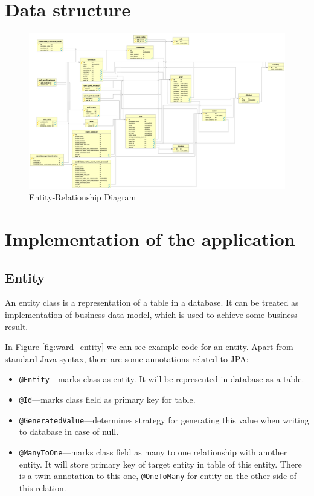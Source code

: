 \documentclass[a4paper,twoside,12pt]{book}
\begin{document}
  \section{Data structure}
    \begin{figure}[h]
      \includegraphics[width=\linewidth]{erd.png}
      \caption{Entity-Relationship Diagram}
      \label{fig:erd}
    \end{figure}

  \section{Implementation of the application}
    \subsection{Entity}
      An entity class is a representation of a table in a database.
      It can be treated as implementation of business data model, which is used to achieve some business result.

      In Figure \ref{fig:ward_entity} we can see example code for an entity.
      Apart from standard Java syntax, there are some annotations related to JPA:
      \begin{itemize}
        \item\lstinline|@Entity|---marks class as entity. It will be represented in database as a table.
        \item\lstinline|@Id|---marks class field as primary key for table.
        \item\lstinline|@GeneratedValue|---determines strategy for generating this value when writing to database in case of null.
        \item\lstinline|@ManyToOne|---marks class field as many to one relationship with another entity. 
        It will store primary key of target entity in table of this entity.
        There is a twin annotation to this one, \lstinline|@OneToMany| for entity on the other side of this relation.
      \end{itemize}
    
\end{document}
